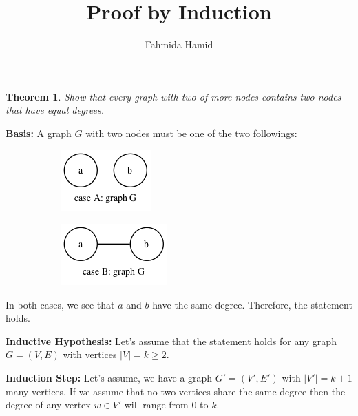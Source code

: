 \documentclass[11pt, oneside]{article}   	%
\title{Proof by Induction}
\author{Fahmida Hamid}
\newtheorem{theorem}{Theorem}
\begin{document}
\maketitle
\begin{theorem}
Show that every graph with two of more nodes contains two nodes that have equal degrees.
\end{theorem}
{\bf Basis:} A graph $G$ with two nodes must be one of the two followings:
\begin{figure}[ht]
\centering
\begin{subfigure}{.5\textwidth}
  \centering
  \includegraphics[width=.4\linewidth]{graphs}
\end{subfigure}%
\begin{subfigure}{.5\textwidth}
  \centering
  \includegraphics[width=.4\linewidth]{graphs1}
\end{subfigure}
\label{fig:test}
\end{figure}
In both cases, we see that $a$ and $b$ have the same degree. Therefore, the statement holds.\\
\par {\bf Inductive Hypothesis:} Let's assume that the statement holds for any graph $G = (V, E)$ with vertices $|V| = k\ge 2$.\\
\par {\bf Induction Step:} 
Let's assume, we have a graph $G' = (V', E')$ with $|V'| = k+1$ many vertices. If we assume that no two vertices share the same degree then the degree of any vertex $w \in V'$ will range from $0$ to $k$. \\
\end{document}
